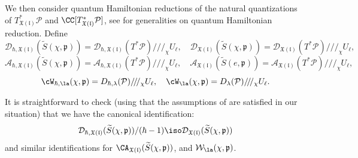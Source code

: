 \documentclass[12pt]{amsart}
\begin{document}
    We then consider quantum Hamiltonian reductions of the natural quantizations of $T^*_{\mathfrak{X}(\mathfrak{l})}\mathcal{P}$ and $\CC[T^*_{\mathfrak{X}(\mathfrak{l})}\mathcal{P}]$, see \cite[Section 3.3, 3.4]{Losev_isofquant} for generalities on quantum Hamiltonian reduction. Define
   \begin{equation*}
\mathcal{D}_{\hbar,\mathfrak{X}(\mathfrak{l})}(\widetilde{S}(\chi,\mathfrak{p}))=\mathcal{D}_{\hbar,\mathfrak{X}(\mathfrak{l})}(T^*\mathcal{P})/\!/\!/_{\chi} U_\ell, \quad  \mathcal{D}_{\mathfrak{X}(\mathfrak{l})}(\widetilde{S}(\chi,\mathfrak{p}))=\mathcal{D}_{\mathfrak{X}(\mathfrak{l})}(T^*\mathcal{P})/\!/\!/_{\chi} U_\ell,
   \end{equation*}
\begin{equation*}
\mathcal{A}_{\hbar,\mathfrak{X}(\mathfrak{l})}(\widetilde{S}(\chi,\mathfrak{p}))=\mathcal{A}_{\hbar,\mathfrak{X}(\mathfrak{l})}(T^*\mathcal{P})/\!/\!/_{\chi} U_\ell, \quad  \mathcal{A}_{\mathfrak{X}(\mathfrak{l})}(\widetilde{S}(e,\mathfrak{p}))=\mathcal{A}_{\mathfrak{X}(\mathfrak{l})}(T^*\mathcal{P})/\!/\!/_{\chi} U_\ell,
\end{equation*}
\begin{equation*}
\cW_{\hbar,\la}(\chi,\mathfrak{p}) = D_{\hbar,\lambda}(\mathcal{P})/\!/\!/_\chi U_{\ell}, \quad \cW_{\la}(\chi,\mathfrak{p}) = D_\lambda(\mathcal{P})/\!/\!/_\chi U_{\ell}.
\end{equation*}

\begin{rmk}
It is straightforward to check (using that the assumptions of \cite[Lemma 3.1.1]{Losev_isofquant} are satisfied in our situation) that we have the canonical identification: 
\begin{equation*}
\mathcal{D}_{\hbar,\mathfrak{X}(\mathfrak{l})}(\widetilde{S}(\chi,\mathfrak{p}))/(\hbar-1) \iso \mathcal{D}_{\mathfrak{X}(\mathfrak{l})}(\widetilde{S}(\chi,\mathfrak{p}))
\end{equation*}
and similar identifications  for $\CA_{\mathfrak{X}(\mathfrak{l})}(\widetilde{S}(\chi,\mathfrak{p}))$,  and $\mathcal{W}_{\la}(\chi,\mathfrak{p})$.
\end{rmk} 
\end{document}

